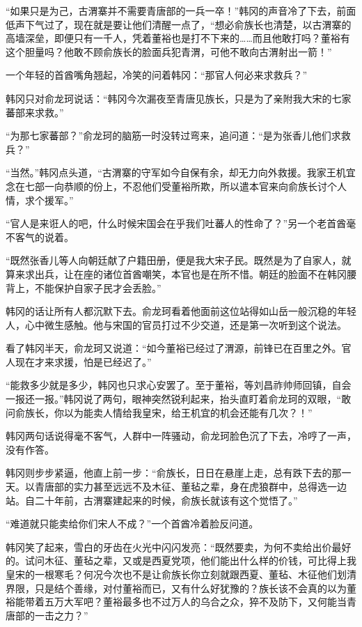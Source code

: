 “如果只是为己，古渭寨并不需要青唐部的一兵一卒！”韩冈的声音冷了下去，前面低声下气过了，现在就是要让他们清醒一点了，“想必俞族长也清楚，以古渭寨的高墙深垒，即便只有一千人，凭着董裕也是打不下来的……而且他敢打吗？董裕有这个胆量吗？他敢不顾俞族长的脸面兵犯青渭，可他不敢向古渭射出一箭！”

一个年轻的首酋嘴角翘起，冷笑的问着韩冈：“那官人何必来求救兵？”

韩冈只对俞龙珂说话：“韩冈今次漏夜至青唐见族长，只是为了亲附我大宋的七家蕃部来求救。”

“为那七家蕃部？”俞龙珂的脑筋一时没转过弯来，追问道：“是为张香儿他们求救兵？”

“当然。”韩冈点头道，“古渭寨的守军如今自保有余，却无力向外救援。我家王机宜念在七部一向恭顺的份上，不忍他们受董裕所欺，所以遣本官来向俞族长讨个人情，求个援军。”

“官人是来诳人的吧，什么时候宋国会在乎我们吐蕃人的性命了？”另一个老首酋毫不客气的说着。

“既然张香儿等人向朝廷献了户籍田册，便是我大宋子民。既然是为了自家人，就算来求出兵，让在座的诸位首酋嘲笑，本官也是在所不惜。朝廷的脸面不在韩冈腰背上，不能保护自家子民才会丢脸。”

韩冈的话让所有人都沉默下去。俞龙珂看着他面前这位站得如山岳一般沉稳的年轻人，心中微生感触。他与宋国的官员打过不少交道，还是第一次听到这个说法。

看了韩冈半天，俞龙珂又说道：“如今董裕已经过了渭源，前锋已在百里之外。官人现在才来求援，怕是已经迟了。”

“能救多少就是多少，韩冈也只求心安罢了。至于董裕，等刘昌祚帅师回镇，自会一报还一报。”韩冈说了两句，眼神突然锐利起来，抬头直盯着俞龙珂的双眼，“敢问俞族长，你以为能卖人情给我皇宋，给王机宜的机会还能有几次？！”

韩冈两句话说得毫不客气，人群中一阵骚动，俞龙珂脸色沉了下去，冷哼了一声，没有作答。

韩冈则步步紧逼，他直上前一步：“俞族长，日日在悬崖上走，总有跌下去的那一天。以青唐部的实力甚至远远不及木征、董毡之辈，身在虎狼群中，总得选一边站。自二十年前，古渭寨建起来的时候，俞族长就该有这个觉悟了。”

“难道就只能卖给你们宋人不成？”一个首酋冷着脸反问道。

韩冈笑了起来，雪白的牙齿在火光中闪闪发亮：“既然要卖，为何不卖给出价最好的。试问木征、董毡之辈，又或是西夏党项，他们能出什么样的价钱，可比得上我皇宋的一根寒毛？何况今次也不是让俞族长你立刻就跟西夏、董毡、木征他们划清界限，只是结个善缘，对付董裕而已，又有什么好犹豫的？族长该不会真的以为董裕能带着五万大军吧？董裕最多也不过万人的乌合之众，猝不及防下，又何能当青唐部的一击之力？”

